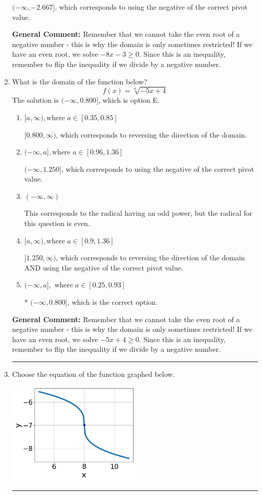 \documentclass{extbook}[14pt]
\newcommand{\litem}[1]{\item #1

\rule{\textwidth}{0.4pt}}
\begin{document}
\begin{enumerate}
{\begin{enumerate}[label=\Alph*.]
$(-\infty, -2.667]$, which corresponds to using the negative of the correct pivot value.
\end{enumerate}

\textbf{General Comment:} Remember that we cannot take the even root of a negative number - this is why the domain is only sometimes restricted! If we have an even root, we solve $-8 x - 3 \geq 0$. Since this is an inequality, remember to flip the inequality if we divide by a negative number.
}
\litem{
What is the domain of the function below?
\[ f(x) = \sqrt[6]{-5 x + 4} \]
The solution is \( (-\infty, 0.800] \), which is option E.\begin{enumerate}[label=\Alph*.]
\item \( [a, \infty), \text{where } a \in [0.35, 0.85] \)

 $[0.800, \infty)$, which corresponds to reversing the direction of the domain.
\item \( (-\infty, a], \text{where } a \in [0.96, 1.36] \)

$(-\infty, 1.250]$, which corresponds to using the negative of the correct pivot value.
\item \( (-\infty, \infty) \)

This corresponds to the radical having an odd power, but the radical for this question is even.
\item \( [a, \infty), \text{where } a \in [0.9, 1.36] \)

$[1.250, \infty)$, which corresponds to reversing the direction of the domain AND using the negative of the correct pivot value.
\item \( (-\infty, a], \text{ where } a \in [0.25, 0.93] \)

* $(-\infty, 0.800]$, which is the correct option.
\end{enumerate}

\textbf{General Comment:} Remember that we cannot take the even root of a negative number - this is why the domain is only sometimes restricted! If we have an even root, we solve $-5 x + 4 \geq 0$. Since this is an inequality, remember to flip the inequality if we divide by a negative number.
}
\litem{
Choose the equation of the function graphed below.

\begin{center}
    \includegraphics[width=0.5\textwidth]{../Figures/radicalGraphToEquationA.png}
\end{center}



}
\end{enumerate}
\end{document}
